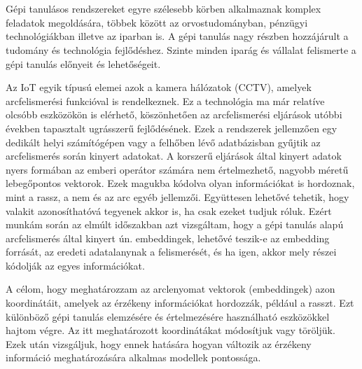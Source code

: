 \section{\bevezetes}

Gépi tanulásos rendszereket egyre szélesebb körben alkalmaznak komplex feladatok megoldására, többek között az orvostudományban, pénzügyi technológiákban illetve az iparban is. A gépi tanulás nagy részben hozzájárult a tudomány és technológia fejlődéshez. Szinte minden iparág és vállalat felismerte a gépi tanulás előnyeit és lehetőségeit.

Az IoT egyik típusú elemei azok a kamera hálózatok (CCTV), amelyek arcfelismerési funkcióval is rendelkeznek. Ez a technológia ma már relatíve olcsóbb eszközökön is elérhető, köszönhetően az arcfelismerési eljárások utóbbi években tapasztalt ugrásszerű fejlődésének. Ezek a rendszerek jellemzően egy dedikált helyi számítógépen vagy a felhőben lévő adatbázisban gyűjtik az arcfelismerés során kinyert adatokat. A korszerű eljárások által kinyert adatok nyers formában az emberi operátor számára nem értelmezhető, nagyobb méretű lebegőpontos vektorok. Ezek magukba kódolva olyan információkat is hordoznak, mint a rassz, a nem és az arc egyéb jellemzői.  Együttesen lehetővé tehetik, hogy valakit azonosíthatóvá tegyenek akkor is, ha csak ezeket tudjuk róluk. Ezért munkám során az elmúlt időszakban azt vizsgáltam, hogy a gépi tanulás alapú arcfelismerés által kinyert ún. embeddingek, lehetővé teszik-e az embedding forrását, az eredeti adatalanynak a felismerését, és ha igen, akkor mely részei kódolják az egyes információkat.

A célom, hogy meghatározzam az arclenyomat vektorok (embeddingek) azon koordinátáit, amelyek az érzékeny információkat hordozzák, például a rasszt. Ezt különböző gépi tanulás elemzésére és értelmezésére használható eszközökkel hajtom végre. Az itt meghatározott koordinátákat módosítjuk vagy töröljük. Ezek után vizsgáljuk, hogy ennek hatására hogyan változik az érzékeny információ meghatározására alkalmas modellek pontossága.




